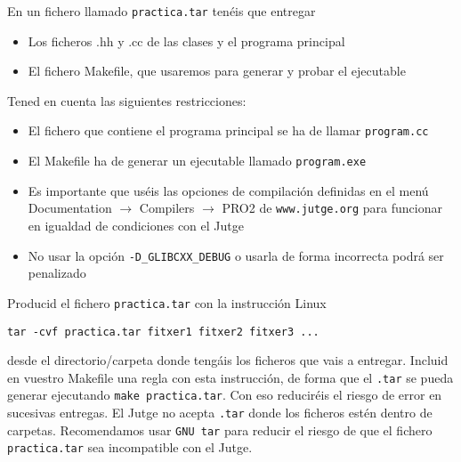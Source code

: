 En un fichero llamado {\tt practica.tar} tenéis que entregar
\begin{itemize}
\item
  Los ficheros {.hh} y {.cc}  de las clases y el programa principal
\item
  El fichero Makefile, que usaremos para generar y probar el ejecutable
\end{itemize}
Tened en cuenta  las siguientes restricciones:
\begin{itemize}
\item
  El fichero que contiene el programa principal se ha de llamar {\tt program.cc}
\item
  El Makefile ha de generar un ejecutable llamado {\tt program.exe} 
\item
  Es importante que uséis las opciones de compilación definidas en el menú Documentation $\rightarrow$ Compilers $\rightarrow$ PRO2 de {\tt www.jutge.org} para funcionar en igualdad de condiciones con el Jutge
\item
  No usar la opción {\tt -D\_GLIBCXX\_DEBUG} o usarla de forma incorrecta
  podrá ser penalizado
\end{itemize}

Producid el fichero {\tt practica.tar} con la instrucción Linux
\begin{verbatim}
tar -cvf practica.tar fitxer1 fitxer2 fitxer3 ...
\end{verbatim}
desde el directorio/carpeta donde tengáis los ficheros que vais a
entregar.  Incluid en vuestro Makefile una regla con esta instrucción,
de forma que el {\tt .tar} se pueda generar ejecutando {\tt make
practica.tar}. Con eso reduciréis el riesgo de error en sucesivas
entregas.  El Jutge no acepta {\tt .tar} donde los ficheros estén
dentro de carpetas. Recomendamos usar {\tt GNU tar} para reducir el
riesgo de que el fichero {\tt practica.tar} sea incompatible con el
Jutge. 


\Sample

